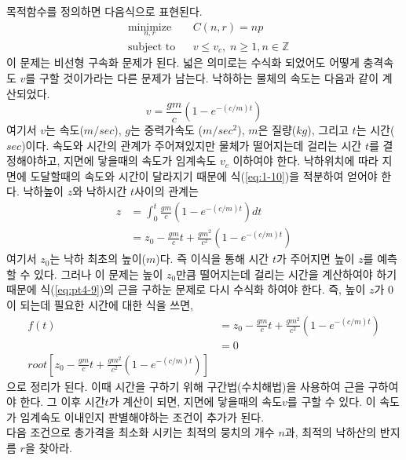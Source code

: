 목적함수를 정의하면 다음식으로 표현된다.
\begin{equation*}
\begin{aligned}
& \underset{n,r}{\text{minimize}}
& & C(n,r) = np\\
& \text{subject to}
& & v \leq v_{c}, \; n \geq 1, n\in\mathbb{Z}
\end{aligned}
\end{equation*}
이 문제는 비선형 구속화 문제가 된다. 넓은 의미로는 수식화 되었어도 어떻게 충격속도 $v$를 구할 것이가라는 다른 문제가 남는다. 낙하하는 물체의 속도는 다음과 같이 계산되었다.
\begin{equation}\label{eq:1-10}
v=\frac{gm}{c}\left(1-e^{-(c/m)t}\right)
\end{equation}
여기서 $v$는 속도($m/sec$), $g$는 중력가속도 ($m/sec^2$), $m$은 질량($kg$), 그리고 $t$는 시간($sec$)이다. 속도와 시간의 관계가 주어져있지만 물체가 떨어지는데 걸리는 시간 $t$를 결정해야하고, 지면에 닿을때의 속도가 임계속도 $v_c$ 이하여야 한다. 낙하위치에 따라 지면에 도달할때의 속도와 시간이 달라지기 때문에 식(\ref{eq:1-10})을 적분하여 얻어야 한다. 낙하높이 $z$와 낙하시간 $t$사이의 관계는
\begin{align}
z&=\int_{0}^{t}\frac{gm}{c}\left(1-e^{-(c/m)t}\right)dt\\
&=z_{0}-\frac{gm}{c}t+\frac{gm^2}{c^2}\left(1-e^{-(c/m)t}\right)\label{eq:pt4-9}
\end{align}
여기서 $z_{0}$는 낙하 최초의 높이($m$)다. 즉 이식을 통해 시간 $t$가 주어지면 높이 $z$를 예측할 수 있다. 그러나 이 문제는 높이 $z_{0}$만큼 떨어지는데 걸리는 시간을 계산하여야 하기 때문에 식(\ref{eq:pt4-9})의 근을 구하눈 문제로 다시 수식화 하여야 한다. 즉, 높이 $z$가 $0$이 되는데 필요한 시간에 대한 식을 쓰면,
\begin{align}
f(t)&=z_{0}-\frac{gm}{c}t+\frac{gm^2}{c^2}\left(1-e^{-(c/m)t}\right)\label{eq:pt4-10}\\
&=0\\
root\left[z_{0}-\frac{gm}{c}t+\frac{gm^2}{c^2}\left(1-e^{-(c/m)t}\right)\right]
\end{align}
으로 정리가 된다. 이때 시간을 구하기 위해 구간법(수치해법)을 사용하여 근을 구하여야 한다. 그 이후 시간$t$가 계산이 되면, 지면에 닿을때의 속도$v$를 구할 수 있다. 이 속도가 임계속도 이내인지 판별해야하는 조건이 추가가 된다.\\

다음 조건으로 총가격을 최소화 시키는 최적의 뭉치의 개수 $n$과, 최적의 낙하산의 반지름 $r$을 찾아라.

